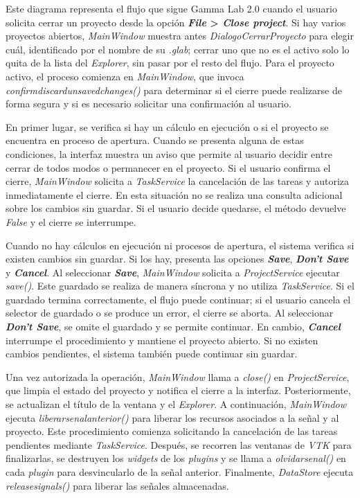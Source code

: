 \documentclass[12pt,letterpaper,oneside]{article}
\DeclareRobustCommand{\_}{\textunderscore\allowbreak}
\begin{document}
Este diagrama representa el flujo que sigue Gamma Lab 2.0 cuando el usuario solicita cerrar un proyecto desde la opción \textbf{\textit{File} > \textit{Close project}}. Si hay varios proyectos abiertos, \textit{MainWindow} muestra antes \textit{DialogoCerrarProyecto} para elegir cuál, identificado por el nombre de su \textit{.glab}; cerrar uno que no es el activo solo lo quita de la lista del \textit{Explorer}, sin pasar por el resto del flujo. Para el proyecto activo, el proceso comienza en \textit{MainWindow}, que invoca \textit{\textunderscore{}confirm\_discard\_unsaved\_changes()} para determinar si el cierre puede realizarse de forma segura y si es necesario solicitar una confirmación al usuario.

En primer lugar, se verifica si hay un cálculo en ejecución o si el proyecto se encuentra en proceso de apertura. Cuando se presenta alguna de estas condiciones, la interfaz muestra un aviso que permite al usuario decidir entre cerrar de todos modos o permanecer en el proyecto. Si el usuario confirma el cierre, \textit{MainWindow} solicita a \textit{TaskService} la cancelación de las tareas y autoriza inmediatamente el cierre. En esta situación no se realiza una consulta adicional sobre los cambios sin guardar. Si el usuario decide quedarse, el método devuelve \textit{False} y el cierre se interrumpe.

Cuando no hay cálculos en ejecución ni procesos de apertura, el sistema verifica si existen cambios sin guardar. Si los hay, presenta las opciones \textbf{\textit{Save}}, \textbf{\textit{Don't Save}} y \textbf{\textit{Cancel}}. Al seleccionar \textbf{\textit{Save}}, \textit{MainWindow} solicita a \textit{ProjectService} ejecutar \textit{save()}. Este guardado se realiza de manera síncrona y no utiliza \textit{TaskService}. Si el guardado termina correctamente, el flujo puede continuar; si el usuario cancela el selector de guardado o se produce un error, el cierre se aborta. Al seleccionar \textbf{\textit{Don't Save}}, se omite el guardado y se permite continuar. En cambio, \textbf{\textit{Cancel}} interrumpe el procedimiento y mantiene el proyecto abierto. Si no existen cambios pendientes, el sistema también puede continuar sin guardar.

Una vez autorizada la operación, \textit{MainWindow} llama a \textit{close()} en \textit{ProjectService}, que limpia el estado del proyecto y notifica el cierre a la interfaz. Posteriormente, se actualizan el título de la ventana y el \textit{Explorer}. A continuación, \textit{MainWindow} ejecuta \textit{liberar\_senal\_anterior()} para liberar los recursos asociados a la señal y al proyecto. Este procedimiento comienza solicitando la cancelación de las tareas pendientes mediante \textit{TaskService}. Después, se recorren las ventanas de \textit{VTK} para finalizarlas, se destruyen los \textit{widgets} de los \textit{plugins} y se llama a \textit{olvidar\_senal()} en cada \textit{plugin} para desvincularlo de la señal anterior. Finalmente, \textit{DataStore} ejecuta \textit{release\_signals()} para liberar las señales almacenadas.
\end{document}
